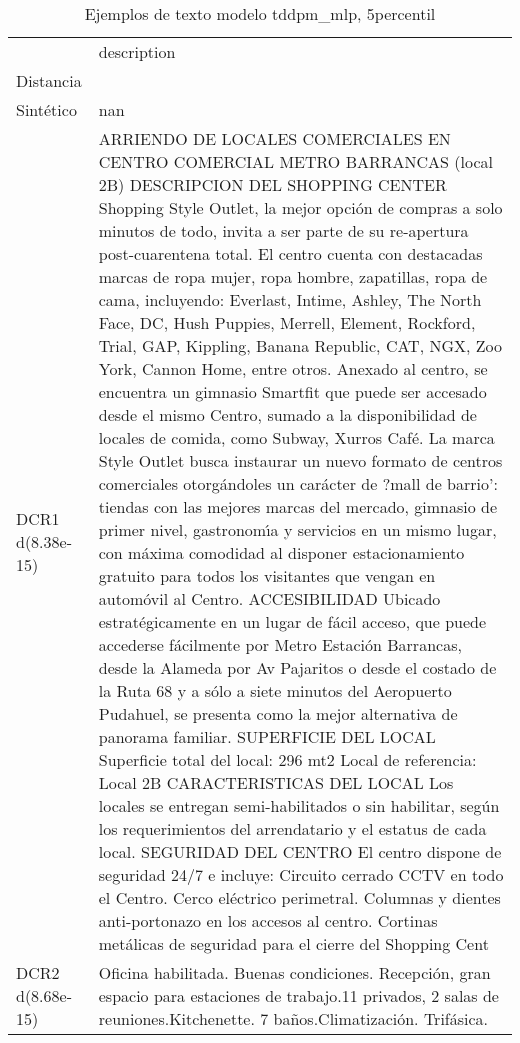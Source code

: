 \begin{table}[H]
\centering
\fontsize{10}{14}\selectfont
\caption{Ejemplos de texto modelo tddpm\_mlp, 5percentil}
\label{table-example-economicos-b-2-tddpm_mlp-5p-text}
\begin{tabular}{|l|m{35em}|}
\hline
\rowcolor[gray]{0.8}
 & description \\
Distancia &  \\
\hline Sintético & nan \\
\hline DCR1 d(8.38e-15) & ARRIENDO DE LOCALES COMERCIALES EN CENTRO COMERCIAL METRO BARRANCAS (local 2B)  DESCRIPCION DEL SHOPPING CENTER Shopping Style Outlet, la mejor opci\'on de compras a solo minutos de todo, invita a ser parte de su re-apertura post-cuarentena total.  El centro cuenta con destacadas marcas de ropa mujer, ropa hombre, zapatillas, ropa de cama, incluyendo: Everlast, Intime, Ashley, The North Face, DC, Hush Puppies, Merrell, Element, Rockford, Trial, GAP, Kippling, Banana Republic, CAT, NGX, Zoo York, Cannon Home, entre otros.   Anexado al centro, se encuentra un gimnasio Smartfit que puede ser accesado desde el mismo Centro, sumado a la disponibilidad de locales de comida, como Subway, Xurros Caf\'e.  La marca Style Outlet busca instaurar un nuevo formato de centros comerciales otorg\'andoles un car\'acter de ?mall de barrio': tiendas con las mejores marcas del mercado, gimnasio de primer nivel, gastronom{\'\i}a y servicios en un mismo lugar, con m\'axima comodidad al disponer estacionamiento gratuito para todos los visitantes que vengan en autom\'ovil al Centro.  ACCESIBILIDAD Ubicado estrat\'egicamente en un lugar de f\'acil acceso, que puede accederse f\'acilmente por Metro Estaci\'on Barrancas, desde la Alameda por Av Pajaritos o desde el costado de la Ruta 68 y a s\'olo a siete minutos del Aeropuerto Pudahuel, se presenta como la mejor alternativa de panorama familiar.  SUPERFICIE DEL LOCAL Superficie total del local: 296 mt2 Local de referencia: Local 2B  CARACTERISTICAS DEL LOCAL Los locales se entregan semi-habilitados o sin habilitar, seg\'un los requerimientos del arrendatario y el estatus de cada local.  SEGURIDAD DEL CENTRO El centro dispone de seguridad 24/7 e incluye: Circuito cerrado CCTV en todo el Centro. Cerco el\'ectrico perimetral. Columnas y dientes anti-portonazo en los accesos al centro. Cortinas met\'alicas de seguridad para el cierre del Shopping Cent \\
\hline DCR2 d(8.68e-15) & Oficina habilitada. Buenas condiciones. Recepci\'on, gran espacio para estaciones de trabajo.11 privados, 2 salas de reuniones.Kitchenette. 7 ba\~nos.Climatizaci\'on.  Trif\'asica. \\
\hline
\end{tabular}
\end{table}
